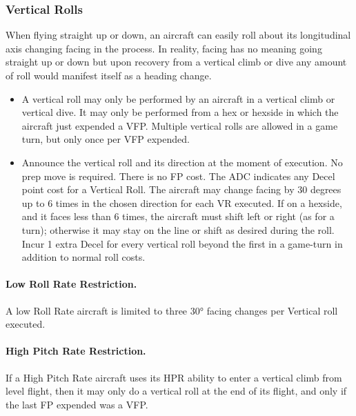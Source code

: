 \subsubsection{Vertical Rolls}

When flying straight up or down, an aircraft can easily roll about its longitudinal axis changing facing in the process. In reality, facing has no meaning going straight up or down but upon recovery from a vertical climb or dive any amount of roll would manifest itself as a heading change.

\begin{itemize}

    \item{} A vertical roll may only be performed by an aircraft in a vertical climb or vertical dive. It may only be performed from a hex or hexside in which the aircraft just expended a VFP. Multiple vertical rolls are allowed in a game turn, but only once per VFP expended.

    \item{} Announce the vertical roll and its direction at the moment of execution. No prep move is required. There is no FP cost. The ADC indicates any Decel point cost for a Vertical Roll. The aircraft may change facing  by 30 degrees up to 6 times in the chosen direction for each VR executed. If on a hexside, and it faces less than 6 times, the aircraft must shift left or right (as for a turn); otherwise it may stay on the line or shift as desired during the roll.  Incur 1 extra Decel for every vertical roll beyond the first in a game-turn in addition to normal roll costs.

\end{itemize}

\paragraph{Low Roll Rate Restriction.} A low Roll Rate aircraft is limited to three 30° facing changes per Vertical roll executed.

\paragraph{High Pitch Rate Restriction.} If a High Pitch Rate aircraft uses its HPR ability to enter a vertical climb from level flight, then it may only do a vertical roll at the end of its flight, and only if the last FP expended was a VFP.

